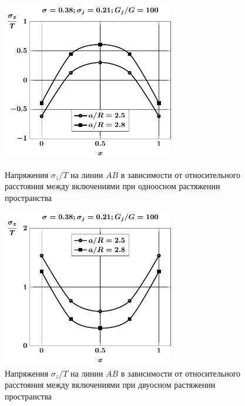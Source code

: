 \begin{russian}
\begin{figure}[h!]
\centering\footnotesize
\parbox[b]{7.5cm}{\centering\includegraphics[width=7.5cm]{inc13-a-d95-g100-t1-sig_z-ab.pdf}
\caption{Напряжения $\sigma_z/T$ на линии  $AB$ в зависимости от относительного расстояния между включениями при одноосном растяжении пространства
\label{f:8:76}}}\hfil\hfil
\parbox[b]{7.5cm}{\centering\includegraphics[width=7.5cm]{inc13-a-d95-g100-t2-sig_z-ab.pdf}
\caption{Напряжения $\sigma_z/T$ на линии  $AB$ в зависимости от относительного расстояния между включениями при двуосном растяжении пространства
\label{f:8:77}}}
\end{figure}


\end{russian}
